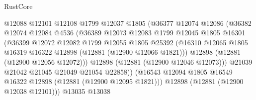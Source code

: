 \begin{lexlean}{RustCore}
\begin{coremodule}
                                  @12088
                                  @12101
                                  @12108
                                  @1799
                                  @12037
                                  @1805
                                  (@36377
                                    @12074
                                    @12086
                                    (@36382
                                      @12074
                                      @12084
                                      @4536
                                      (@36389
                                        @12073
                                        @12083
                                        @1799
                                        @12045
                                        @1805
                                        @16301
                                        (@36399
                                          @12072
                                          @12082
                                          @1799
                                          @12055
                                          @1805
                                          @25392
                                          (@16310
                                            @12065
                                            @1805
                                            @16319
                                            @16322
                                            @12898
                                            (@12881 (@12900 @12066 @1821)))
                                          @12898
                                          (@12881 (@12900 @12056 @12072)))
                                        @12898
                                        (@12881 (@12900 @12046 @12073)))
                                      @21039
                                      @21042
                                      @21045
                                      @21049
                                      @21054
                                      @22858))
                                  (@16543
                                    @12094
                                    @1805
                                    @16549
                                    @16322
                                    @12898
                                    (@12881 (@12900 @12095 @1821)))
                                  @12898
                                  (@12881 (@12900 @12038 @12101)))
                                @13035
                                @13038

\end{coremodule}
\end{lexlean}
